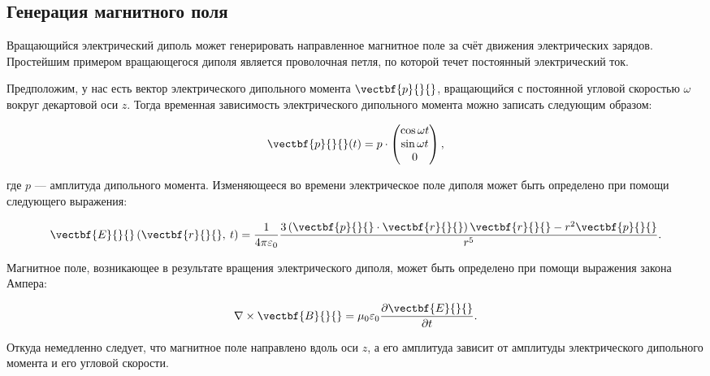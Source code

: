 \subsection{Генерация магнитного поля}

Вращающийся электрический диполь может генерировать направленное магнитное поле за счёт движения электрических зарядов. Простейшим примером вращающегося диполя является проволочная петля, по которой течет постоянный электрический ток.

Предположим, у нас есть вектор электрического дипольного момента $\vectbf{p}{}{}$, вращающийся с постоянной угловой скоростью $\omega$ вокруг декартовой оси $z$. Тогда временная зависимость электрического дипольного момента можно записать следующим образом:

\begin{equation}
    \vectbf{p}{}{}(t) = p \cdot \begin{pmatrix}\cos{\omega t} \\ \sin{\omega t} \\ 0\end{pmatrix},
\end{equation}

\noindent где $p$ --- амплитуда дипольного момента. Изменяющееся во времени электрическое поле диполя может быть определено при помощи следующего выражения:

\begin{equation}
    \vectbf{E}{}{} \left( \vectbf{r}{}{}, \: t \right) = \frac{1}{4 \pi \varepsilon_0} \frac{3 \left( \vectbf{p}{}{} \cdot \vectbf{r}{}{} \right) \vectbf{r}{}{} - r^2 \vectbf{p}{}{}}{r^5}.
\end{equation}

Магнитное поле, возникающее в результате вращения электрического диполя, может быть определено при помощи выражения закона Ампера:

\begin{equation}
    \nabla \times \vectbf{B}{}{} = \mu_0 \varepsilon_0 \frac{\partial \vectbf{E}{}{}}{\partial t}.
\end{equation}

Откуда немедленно следует, что магнитное поле направлено вдоль оси $z$, а его амплитуда зависит от амплитуды электрического дипольного момента и его угловой скорости.